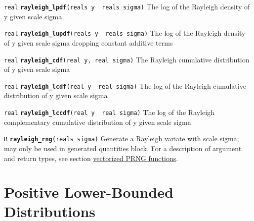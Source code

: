 \documentclass[
  10pt,
]{book}
\begin{document}

\texttt{real} \textbf{\texttt{rayleigh\_lpdf}}\texttt{(reals\ y\ \textbar{}\ reals\ sigma)}\newline
The log of the Rayleigh density of y given scale sigma


\texttt{real} \textbf{\texttt{rayleigh\_lupdf}}\texttt{(reals\ y\ \textbar{}\ reals\ sigma)}\newline
The log of the Rayleigh density of y given scale sigma
dropping constant additive terms


\texttt{real} \textbf{\texttt{rayleigh\_cdf}}\texttt{(real\ y,\ real\ sigma)}\newline
The Rayleigh cumulative distribution of y given scale sigma


\texttt{real} \textbf{\texttt{rayleigh\_lcdf}}\texttt{(real\ y\ \textbar{}\ real\ sigma)}\newline
The log of the Rayleigh cumulative distribution of y given scale sigma


\texttt{real} \textbf{\texttt{rayleigh\_lccdf}}\texttt{(real\ y\ \textbar{}\ real\ sigma)}\newline
The log of the Rayleigh complementary cumulative distribution of y
given scale sigma


\texttt{R} \textbf{\texttt{rayleigh\_rng}}\texttt{(reals\ sigma)}\newline
Generate a Rayleigh variate with scale sigma; may only be used in
generated quantities block. For a description of argument and return
types, see section \protect\hyperlink{prng-vectorization}{vectorized PRNG functions}.

\hypertarget{positive-lower-bounded-distributions}{%
\chapter{Positive Lower-Bounded Distributions}\label{positive-lower-bounded-distributions}}
\end{document}
